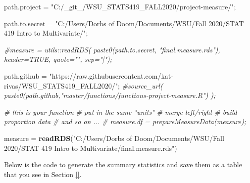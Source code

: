 \documentclass[]{article}
\newenvironment{Shaded}{\begin{snugshade}}{\end{snugshade}}
\newcommand{\CommentTok}[1]{\textcolor[rgb]{0.56,0.35,0.01}{\textit{#1}}}
\newcommand{\KeywordTok}[1]{\textcolor[rgb]{0.13,0.29,0.53}{\textbf{#1}}}
\newcommand{\NormalTok}[1]{#1}
\newcommand{\StringTok}[1]{\textcolor[rgb]{0.31,0.60,0.02}{#1}}
\begin{document}
\begin{Shaded}
\begin{Highlighting}[]
\NormalTok{path.project =}\StringTok{ "C:/_git_/WSU_STATS419_FALL2020/project-measure/"}\NormalTok{;}

\NormalTok{path.to.secret =}\StringTok{ "C:/Users/Dorbs of Doom/Documents/WSU/Fall 2020/STAT 419 Intro to Multivariate/"}\NormalTok{;}

\CommentTok{#measure = utils::readRDS( paste0(path.to.secret, "final.measure.rds"), header=TRUE, quote="", sep="|");}

\NormalTok{path.github =}\StringTok{ "https://raw.githubusercontent.com/kat-rivas/WSU_STATS419_FALL2020/"}\NormalTok{;}
\CommentTok{#source_url( paste0(path.github,"master/functions/functions-project-measure.R") );}

\CommentTok{# this is your function}
\CommentTok{# put in the same "units"}
\CommentTok{# merge left/right}
\CommentTok{# build proportion data}
\CommentTok{# and so on ... }
\CommentTok{# measure.df = prepareMeasureData(measure);}

\NormalTok{measure =}\StringTok{ }\KeywordTok{readRDS}\NormalTok{(}\StringTok{"C:/Users/Dorbs of Doom/Documents/WSU/Fall 2020/STAT 419 Intro to Multivariate/final.measure.rds"}\NormalTok{)}
\end{Highlighting}
\end{Shaded}

Below is the code to generate the summary statistics and save them as a
table that you see in Section \ref{}.






\newpage
\theendnotes

\newpage
\begin{auxmulticols}{2}
\singlespacing 


\end{auxmulticols}

\newpage
{
\hypersetup{linkcolor=black}
\setcounter{tocdepth}{3}
\tableofcontents
}
\end{document}
